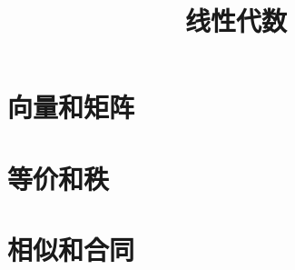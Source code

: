 \documentclass[aspectratio=169,handout]{ctexbeamer}
\title{线性代数}
\begin{document}


\part{向量和矩阵}






\part{等价和秩}







\part{相似和合同}



\end{document}
